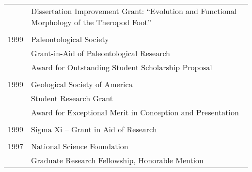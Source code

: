 \begin{longtable}{@{}lX@{}}
    & Dissertation Improvement Grant: ``Evolution and Functional Morphology of the Theropod Foot''\\
    \\
    1999 & Paleontological Society\\
    & Grant-in-Aid of Paleontological Research\\
    & Award for Outstanding Student Scholarship Proposal\\
    \\
    1999 & Geological Society of America\\
    & Student Research Grant\\
    & Award for Exceptional Merit in Conception and Presentation\\
    \\
    1999 & Sigma Xi -- Grant in Aid of Research\\
    \\
    1997 & National Science Foundation\\
    & Graduate Research Fellowship, Honorable Mention\\
\end{longtable}
